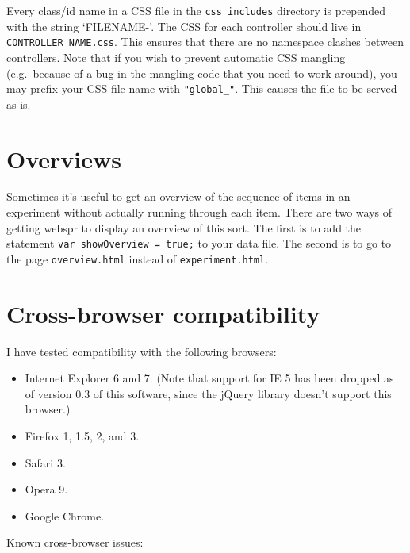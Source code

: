 \documentclass[]{article}
\begin{document}
Every class/id name in a CSS file in the \texttt{css\_includes}
directory is prepended with the string `FILENAME-'. The CSS for each
controller should live in \texttt{CONTROLLER\_NAME.css}. This ensures
that there are no namespace clashes between controllers. Note that if
you wish to prevent automatic CSS mangling (e.g.~because of a bug in the
mangling code that you need to work around), you may prefix your CSS
file name with \texttt{"global\_"}. This causes the file to be served
as-is.

\section{Overviews}\label{overviews}

Sometimes it's useful to get an overview of the sequence of items in an
experiment without actually running through each item. There are two
ways of getting webspr to display an overview of this sort. The first is
to add the statement \texttt{var\ showOverview\ =\ true;} to your data
file. The second is to go to the page \texttt{overview.html} instead of
\texttt{experiment.html}.

\section{Cross-browser compatibility}\label{cross-browser-compatibility}

I have tested compatibility with the following browsers:

\begin{itemize}
\itemsep1pt\parskip0pt
\item
  Internet Explorer 6 and 7. (Note that support for IE 5 has been
  dropped as of version 0.3 of this software, since the jQuery library
  doesn't support this browser.)
\item
  Firefox 1, 1.5, 2, and 3.
\item
  Safari 3.
\item
  Opera 9.
\item
  Google Chrome.
\end{itemize}

Known cross-browser issues:
\end{document}
